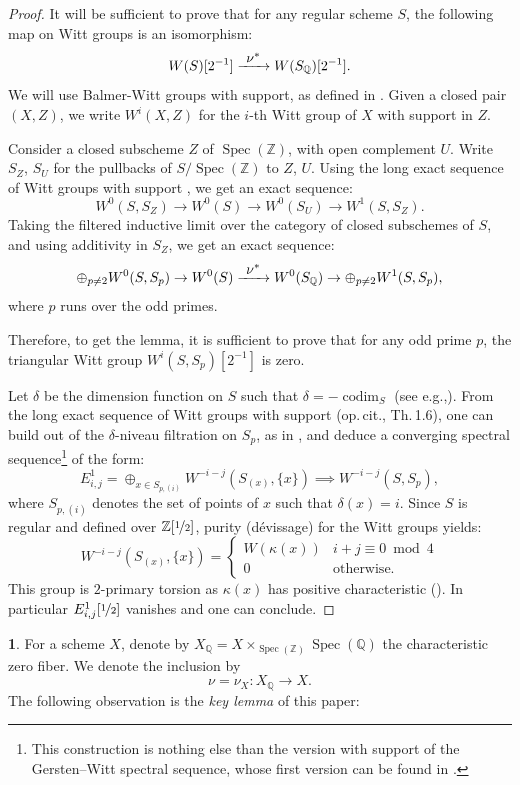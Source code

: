 \documentclass[10pt,a4paper]{amsart}
\def\To#1{\mathchoice{\xrightarrow{\textstyle\kern4pt#1\kern3pt}}{\stackrel{#1}{\longrightarrow}}{}{}}
\DeclareMathOperator{\codim}{codim}
\DeclareMathOperator{\spec}{Spec}
\newcommand{\ZZ} {\mathbb Z}
\newcommand{\ZZot} {\mathbb Z[\nicefrac 1 2]}
\newcommand{\ot} {{\nicefrac 1 2}}
\newcommand{\QQ} {\mathbb Q}
\theoremstyle{remark}
\theoremstyle{definition}
\newtheorem{num}[thm]{}
\numberwithin{equation}{thm}
\newcommand{\eg}{e.g.,\xspace}
\begin{document}
\begin{proof}
It will be sufficient to prove that for any regular scheme $S$, the following map on Witt groups
is an isomorphism:
\[
W(S)[2^{-1}] \To{\nu^*} W(S_\QQ)[2^{-1}].
\]
We will use Balmer-Witt groups with support, as defined in \cite[\S 1]{BalmerWitt}.
Given a closed pair $(X,Z)$, we write $W^i(X,Z)$ for the $i$-th Witt group of $X$ with support in $Z$.

Consider a closed subscheme $Z$ of $\spec(\ZZ)$, with open complement $U$.
Write $S_Z$, $S_U$ for the pullbacks of $S/\spec(\ZZ)$ to $Z$, $U$.
Using the long exact sequence of Witt groups with support \cite[1.7]{BalmerWitt},
we get an exact sequence:
\[
W^0(S,S_Z) \to W^0(S) \to W^0(S_U) \to W^1(S,S_Z).
\]
Taking the filtered inductive limit over the category of closed subschemes of $S$,
and using additivity in $S_Z$, we get an exact sequence:
\[
\oplus_{p\neq 2} W^0(S,S_p) \to W^0(S) \To{\nu^*} W^0(S_\QQ) \to \oplus_{p\neq 2} W^1(S,S_p),
\]
where $p$ runs over the odd primes.

Therefore, to get the lemma, it is sufficient to prove that for any odd prime $p$,
the triangular Witt group $W^i(S,S_p)[2^{-1}]$ is zero.

Let $\delta$ be the dimension function on $S$ such that $\delta=-\codim_S$
(see \eg \cite[\S 1.1]{BD1}).
From the long exact sequence of Witt groups with support (op.\,cit., Th.\,1.6),
one can build out of the $\delta$-niveau filtration on $S_p$,
as in \cite[\S 3.1]{BD1}, and deduce a converging spectral
sequence\footnote{This construction is nothing else than the version with support of the Gersten--Witt spectral sequence,
whose first version can be found in \cite{BalmerWalter}.} of the form:
\[
E^1_{i,j}=\oplus_{x \in S_{p,(i)}} W^{-i-j}(S_{(x)},\{x\}) \implies W^{-i-j}(S,S_p),
\]
where $S_{p,{(i)}}$ denotes the set of points of $x$ such that $\delta(x)=i$.
Since $S$ is regular and defined over $\ZZot$, purity (dévissage) for the Witt groups \cite[Th.\,6.1]{BalmerWalter} yields:
\[
W^{-i-j}(S_{(x)},\{x\})=
\begin{cases}
W(\kappa(x)) & i+j\equiv 0 \bmod 4 \\
0 & \text{otherwise.}
\end{cases}
\]
This group is $2$-primary torsion as $\kappa(x)$ has positive characteristic
(\cite[VIII\,3.2 \& 6.15]{LamQuadratic}).
In particular $E^1_{i,j}[\ot]$ vanishes and one can conclude.
\end{proof}

\begin{num}\label{num:zero_part}
For a scheme $X$, denote by $X_\QQ = X\times_{\spec(\ZZ)}\spec(\QQ)$ the characteristic zero fiber.
We denote the inclusion by
\begin{equation*}
\nu = \nu_X : X_\QQ \to X.
\end{equation*}
The following observation is the \textit{key lemma} of this paper:
\end{num}
\end{document}
